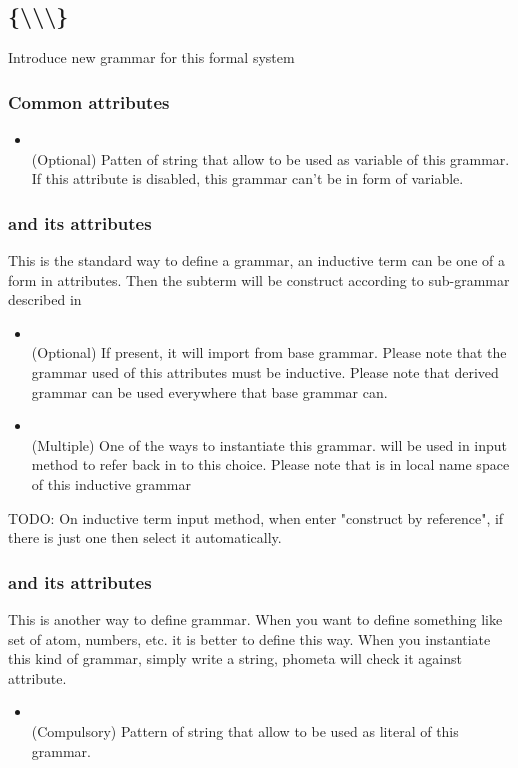 \documentclass[master.tex]{subfiles}
\begin{document}
\subsection{\kGrammar {} \{\kInductive \textbackslash \kLiteral \textbackslash \kSequence \textbackslash \kDictionary\} }
Introduce new grammar for this formal system

\subsubsection{Common attributes}

\begin{itemize}
    \item \kVarRegex {} \\
    (Optional) Patten of string that allow to be used as variable of this grammar. If this attribute is disabled, this grammar can't be in form of variable.
\end{itemize}

\subsubsection{\kInductive and its attributes}
This is the standard way to define a grammar, an inductive term can be one of a form in \kChoice attributes. Then the subterm will be construct according to sub-grammar described in \kChoice
\begin{itemize}
    \item \kExtend {} \\
    (Optional) If present, it will import \kChoice from base grammar. Please note that the grammar used of this attributes must be inductive. Please note that derived grammar can be used everywhere that base grammar can.
    \item \kChoice {} \kRef {} \\
    (Multiple) One of the ways to instantiate this grammar.  will be used in input method to refer back in to this choice. Please note that  is in local name space of this inductive grammar
\end{itemize}

  TODO: On inductive term input method, when enter "construct by reference", if there is just one \kChoice then select it automatically.

\subsubsection{\kLiteral and its attributes}
This is another way to define grammar. When you want to define something like set of atom, numbers, etc. it is better to define this way. When you instantiate this kind of grammar, simply write a string, phometa will check it against \kRegex attribute.
\begin{itemize}
    \item \kRegex {} \\
    (Compulsory) Pattern of string that allow to be used as literal of this grammar.
\end{itemize}
\end{document}
